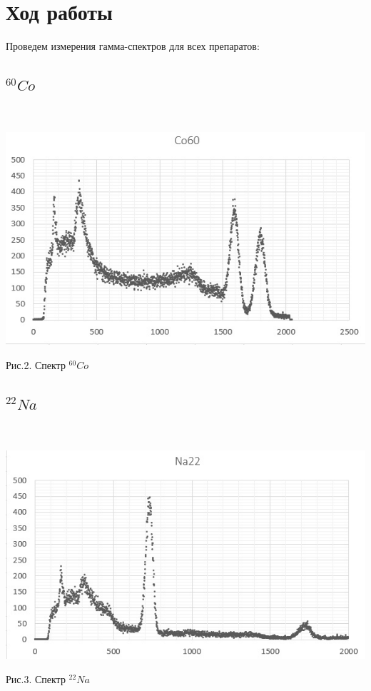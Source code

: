\documentclass[14pt,a4paper]{scrartcl}
\begin{document}
\section{Ход работы}


Проведем измерения гамма-спектров для всех препаратов:\\

\subsection{$^{60} Co$}\\



\begin{center}
\includegraphics[scale=0.7]{Co.jpg}\newline
\caption{Рис.2. Спектр $^{60} Co$}
\end{center}


\subsection{$^{22} Na$}\\



\begin{center}
\includegraphics[scale=0.7]{Na.jpg}\newline
\caption{Рис.3. Спектр $^{22} Na$}
\end{center}
\end{document}
